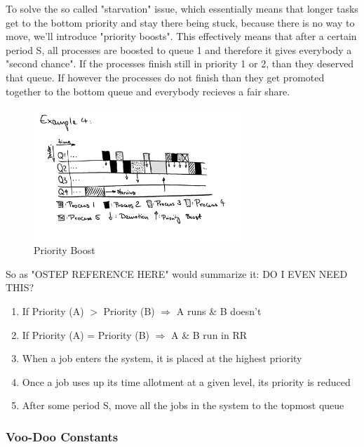 \documentclass{report}
\begin{document}
To solve the so called "starvation" issue, which essentially means that longer tasks get to the bottom priority and stay there being stuck, because there is no way to move, we'll introduce "priority boosts".
This effectively means that after a certain period S, all processes are boosted to queue 1 and therefore it gives everybody a "second chance". If the processes finish still in priority 1 or 2, than they deserved that queue.
If however the processes do not finish than they get promoted together to the bottom queue and everybody recieves a fair share.

\begin{figure}[h]
  \begin{center}
    \includegraphics[width=0.7\textwidth]{assets/mlfq-diag-4.png}
    \caption{Priority Boost}
    \label{mlfq-diag-4}
  \end{center}
\end{figure}

\noindent So as "OSTEP REFERENCE HERE" would summarize it: DO I EVEN NEED THIS?
\begin{enumerate}
  \item If Priority (A) $>$ Priority (B) $\Rightarrow$ A runs \& B doesn't
  \item If Priority (A) = Priority (B) $\Rightarrow$ A \& B run in RR
  \item When a job enters the system, it is placed at the highest priority
  \item Once a job uses up its time allotment at a given level, its priority is reduced
  \item After some period S, move all the jobs in the system to the topmost queue
\end{enumerate}

\subsubsection{Voo-Doo Constants}
\end{document}

